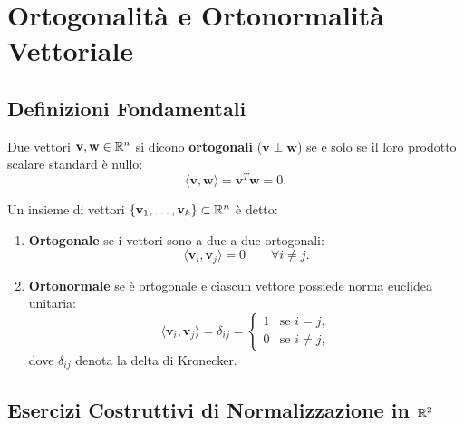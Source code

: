 \FloatBarrier
\section{Ortogonalit\`a e Ortonormalit\`a Vettoriale}

\subsection{Definizioni Fondamentali}

\begin{definition}
Due vettori $\mathbf{v}, \mathbf{w} \in \mathbb{R}^n$ si dicono \textbf{ortogonali} ($\mathbf{v} \perp \mathbf{w}$) se e solo se il loro prodotto scalare standard \`e nullo:
\begin{equation}
    \langle \mathbf{v}, \mathbf{w} \rangle = \mathbf{v}^T \mathbf{w} = 0.
\end{equation}
\end{definition}

\begin{definition}
Un insieme di vettori $\{\mathbf{v}_1, \dots, \mathbf{v}_k\} \subset \mathbb{R}^n$ \`e detto:
\mbox{}\par\nopagebreak
\begin{enumerate}
    \item \textbf{Ortogonale} se i vettori sono a due a due ortogonali:
    \begin{equation}
        \langle \mathbf{v}_i, \mathbf{v}_j \rangle = 0 \qquad \forall i \neq j.
    \end{equation}
    \item \textbf{Ortonormale} se \`e ortogonale e ciascun vettore possiede norma euclidea unitaria:
    \begin{equation}
        \langle \mathbf{v}_i, \mathbf{v}_j \rangle = \delta_{ij} = \begin{cases} 1 & \text{se } i = j, \\ 0 & \text{se } i \neq j, \end{cases}
    \end{equation}
    dove $\delta_{ij}$ denota la delta di Kronecker.
\end{enumerate}
\end{definition}

\subsection{Esercizi Costruttivi di Normalizzazione in \texorpdfstring{$\mathbb{R}^2$}{R2}}

